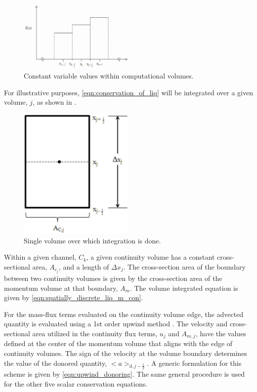 \begin{figure}[ht]
\begin{center}
\includegraphics[width=0.5\textwidth]{images/constant_value.eps}
\end{center}
\caption{Constant variable values within computational volumes.}
\label{fig:constant_value}
\end{figure}

For illustrative purposes, \eqref{eqn:conservation_of_liq} will be integrated over a given volume, $j$, as shown in .

\begin{figure}[h!t]
\begin{center}
\includegraphics[width=0.5\textwidth]{images/single_volume.eps}
\end{center}
\caption{Single volume over which integration is done.}
\label{fig:single_volume}
\end{figure}

Within a given channel, $C_k$, a given continuity volume has a constant cross-sectional area, $A_{c_{j}}$, and a length of $\Delta x_{j}$.
The cross-section area of the boundary between two continuity volumes is given by the cross-section area of the momentum volume at that boundary, $A_{m}$.
The volume integrated equation is given by \eqref{eqn:spatially_discrete_liq_m_con}.

For the mass-flux terms evaluated on the continuity volume edge, the advected quantity is evaluated using a 1st order upwind method \cite{Tannehill1997}.
The velocity and cross-sectional area utilized in the continuity flux terms, $u_j$ and $A_{m,j}$, have the values defined at the center of the momentum volume that aligns with the edge of continuity volumes.
The sign of the velocity at the volume boundary determines the value of the donored quantity, $<a>_{d,j-\frac{1}{2}}$.
A generic formulation for this scheme is given by \eqref{eqn:upwind_donoring}.
The same general procedure is used for the other five scalar conservation equations.

